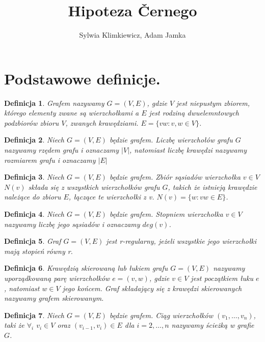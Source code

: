 \documentclass[12pt,a4paper]{article}
\newtheorem{df}{Definicja}[section]
\begin{document}
\title{Hipoteza \v Cernego}
\author{Sylwia Klimkiewicz, Adam Jamka}
\maketitle


\section{Podstawowe definicje.}
\begin{df} 
Grafem nazywamy $G=(V,E)$, gdzie $V$ jest niepustym zbiorem, kt\'orego elementy zwane s\k{a} wierzcho{\l}kami a $E$ jest rodzin\k{a} dwuelemntowych podzbior\'ow zbioru $V$, zwanych kraw\k{e}dziami.
$E=\{vw : v,w\in V \}$.
\end{df}
\begin{df} 
Niech $G=(V,E)$ b\k{e}dzie grafem. Liczb\k{e} wierzcho{\l}\'ow grafu $G$ nazywamy rz\k{e}dem grafu i oznaczamy $|V|$, natomiast liczb\k{e} kraw\k{e}dzi nazywamy rozmiarem grafu i oznaczamy $|E|$
\end{df}
\begin{df} 
Niech $G=(V,E)$ b\k{e}dzie grafem. Zbi\'or s\k{a}siad\'ow wierzcho{\l}ka $v\in V$ $N(v)$ sk{\l}ada si\k{e} z wszystkich wierzcho{\l}k\'ow grafu $G$, takich \.ze istniej\k{a} kraw\k{e}dzie nale\.z\k{a}ce do zbioru $E$, {\l}\k{a}cz\k{a}ce te wierzcho{\l}ki z v. $N(v)=\{w : vw\in E\}$.
\end{df} 
\begin{df} 
Niech $G=(V,E)$ b\k{e}dzie grafem. Stopniem wierzcho{\l}ka $v\in V$ nazywamy liczb\k{e} jego s\k{a}siad\'ow i oznaczamy $deg(v)$.
\end{df}
\begin{df} 
Graf $G=(V,E)$ jest r-regularny, je\.zeli wszystkie jego wierzcho{\l}ki maj\k{a} stopie\'n r\'owny r.
\end{df} 
\begin{df} 
Kraw\k{e}dzi\k{a} skierowan\k{a} lub {\l}ukiem grafu $G=(V,E)$ nazywamy uporz\k{a}dkowan\k{a} par\k{e} wierzcho{\l}k\'ow $e=(v,w)$, gdzie $v\in V$ jest pocz\k{a}tkiem {\l}uku $e$, natomiast $w\in V$ jego ko\'ncem. Graf sk{\l}adaj\k{a}cy si\k{e} z kraw\k{e}dzi skierowanych nazywamy grafem skierowanym.
\end{df}
\begin{df} 
Niech $G=(V,E)$ b\k{e}dzie grafem. Ci\k{a}g wierzcho{\l}k\'ow $(v_{1},\ldots,v_{n})$, taki \.ze $\forall_{i}$ $v_{i}\in V$ oraz  $(v_{i-1},v_{i})\in E$ dla $i=2,\ldots,n$ nazywamy \'scie\.zk\k{a} w grafie $G$.
\end{df} 
\end{document}
